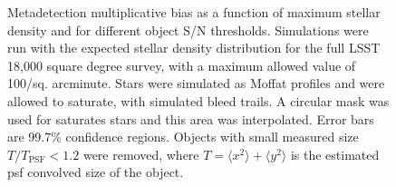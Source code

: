 \documentclass[iop, twocolappendix, appendixfloats, numberedappendix, apj]{hackemulateapj}
\begin{document}
\begin{figure}
\begin{tikzpicture}
\end{tikzpicture}

    \caption{ Metadetection multiplicative bias as a function of maximum
    stellar density and for different object S/N thresholds.  Simulations were
    run with the expected stellar density distribution for the full LSST 18,000
    square degree survey, with a maximum allowed value of 100/sq. arcminute.
    Stars were simulated as Moffat profiles and were allowed to saturate, with
    simulated bleed trails.  A circular mask was used for saturates stars and
    this area was interpolated.  Error bars are 99.7\% confidence regions.
    Objects with small measured size $T/T_{\mathrm{PSF}} < 1.2$ were removed,
    where $T = \langle x^2 \rangle + \langle y^2 \rangle$ is the estimated psf
    convolved size of the object.}

\end{figure}
\end{document}
